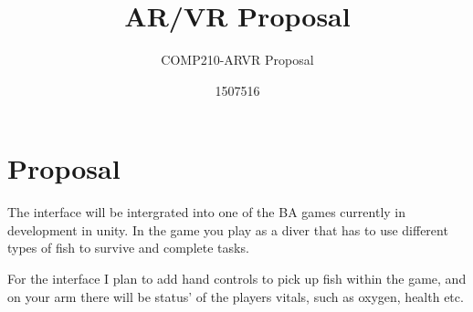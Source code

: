 \documentclass{scrartcl}
\title{AR/VR Proposal }
\subtitle{COMP210-ARVR Proposal}
\author{1507516}
\begin{document}
\maketitle

\section{Proposal}

The interface will be intergrated into one of the BA games currently in development in unity. 
In the game you play as a diver that has to use different types of fish to survive and complete tasks.

For the interface I plan to add hand controls to pick up fish within the game, and on your arm there will be status' of the players vitals, such as oxygen, health etc.
\end{document}
